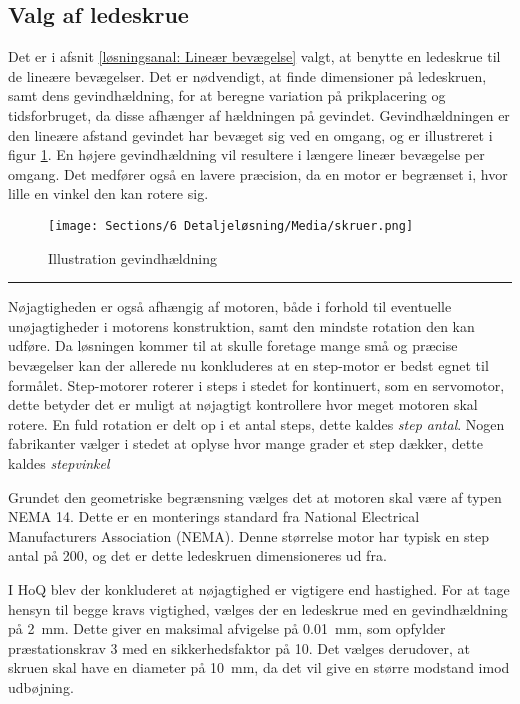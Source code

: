 \subsection{Valg af ledeskrue} \label{Valg af led screw og motor}
Det er i afsnit \ref{løsningsanal: Lineær bevægelse} valgt, at benytte en ledeskrue til de lineære bevægelser. Det er nødvendigt, at finde dimensioner på ledeskruen, samt dens gevindhældning, for at beregne variation på prikplacering og tidsforbruget, da disse afhænger af hældningen på gevindet. 
Gevindhældningen er den lineære afstand gevindet har bevæget sig ved en omgang, og er illustreret i figur \ref{fig: skrue forklaringer}. En højere gevindhældning vil resultere i længere lineær bevægelse per omgang. Det medfører også en lavere præcision, da en motor er begrænset i, hvor lille en vinkel den kan rotere sig.


\begin{figure}[H]
    \centering
    \texttt{[image: Sections/6 Detaljeløsning/Media/skruer.png]}
    \caption{Illustration gevindhældning}
    \label{fig: skrue forklaringer}
\end{figure} \plainbreak{-0.5}

Nøjagtigheden er også afhængig af motoren, både i forhold til eventuelle unøjagtigheder i motorens konstruktion, samt den mindste rotation den kan udføre. Da løsningen kommer til at skulle foretage mange små og præcise bevægelser kan der allerede nu konkluderes at en step-motor er bedst egnet til formålet. Step-motorer roterer i steps i stedet for kontinuert, som en servomotor, dette betyder det er muligt at nøjagtigt kontrollere hvor meget motoren skal rotere. En fuld rotation er delt op i et antal steps, dette kaldes \textit{step antal}. Nogen fabrikanter vælger i stedet at oplyse hvor mange grader et step dækker, dette kaldes \textit{stepvinkel}

Grundet den geometriske begrænsning vælges det at motoren skal være af typen NEMA 14. Dette er en monterings standard fra National Electrical Manufacturers Association (NEMA). Denne størrelse motor har typisk en step antal på 200, og det er dette ledeskruen dimensioneres ud fra.

I HoQ blev der konkluderet at nøjagtighed er vigtigere end hastighed.  For at tage hensyn til begge kravs vigtighed, vælges der en ledeskrue med en gevindhældning på \SI{2}{mm}. Dette giver en maksimal afvigelse på \SI{0,01}{mm}, som opfylder præstationskrav 3 med en sikkerhedsfaktor på 10. Det vælges derudover, at skruen skal have en diameter på \SI{10}{mm}, da det vil give en større modstand imod udbøjning. \parencite{Igus2025DrylinSteel}




